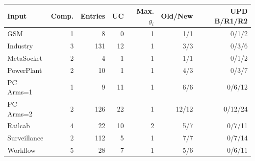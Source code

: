 \begin{tabular}{@{}lr@{\qquad}rrrrr@{}}\toprule
Input & Comp. & Entries & UC & Max. $g_i$ & Old/New & UPD B/R1/R2\\\midrule
GSM & 1 & 8 & 0 & 1 & 1/1 & 0/1/2\\
Industry & 3 & 131 & 12 & 1 & 3/3 & 0/3/6\\
MetaSocket & 2 & 4 & 1 & 1 & 1/1 & 0/1/2\\
PowerPlant & 2 & 10 & 1 & 1 & 4/3 & 0/3/7\\
PC Arms=1 & 1 & 9 & 11 & 1 & 6/6 & 0/6/12\\
PC Arms=2 & 2 & 126 & 22 & 1 & 12/12 & 0/12/24\\
Railcab & 4 & 22 & 10 & 2 & 5/7 & 0/7/11\\
Surveillance & 2 & 112 & 5 & 1 & 7/7 & 0/7/14\\
Workflow & 5 & 28 & 7 & 1 & 5/6 & 0/6/11\\
\bottomrule\end{tabular}
\par{}
